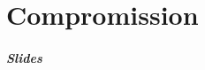 \part{Compromission}

\begin{frame}
	\partpage
\end{frame}

\begin{frame}
	\frametitle{Slides}
\end{frame}
